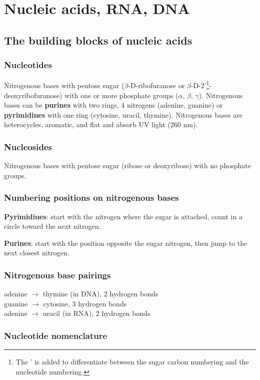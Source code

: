 \documentclass[letterpaper, 12pt]{article}
\begin{document}
\newpage

\section*{Nucleic acids, RNA, DNA}

\subsection*{The building blocks of nucleic acids}

\subsubsection*{Nucleotides}
Nitrogenous bases with pentose sugar ($\beta$-D-ribofuranose or $\beta$-D-2'\footnote{The ' is added to differentiate between the sugar carbon numbering and the nucleotide numbering.}-deoxyribofuranose) with one or more phosphate groups ($\alpha$, $\beta$, $\gamma$). Nitrogenous bases can be \textbf{purines} with two rings, 4 nitrogens (adenine, guanine) or \textbf{pyrimidines} with one ring (cytosine, uracil, thymine). Nitrogenous bases are heterocycles, aromatic, and flat and absorb UV light (260 nm).

\subsubsection*{Nucleosides}
Nitrogenous bases with pentose sugar (ribose or deoxyribose) with no phosphate groups.

\subsubsection*{Numbering positions on nitrogenous bases}
\textbf{Pyrimidines}: start with the nitrogen where the sugar is attached, count in a circle toward the next nitrogen.

\textbf{Purines}: start with the position opposite the sugar nitrogen, then jump to the next closest nitrogen.

\subsubsection*{Nitrogenous base pairings}
adenine $\to$ thymine (in DNA), 2 hydrogen bonds \\
guanine $\to$ cytosine, 3 hydrogen bonds \\
adenine $\to$ uracil (in RNA), 2 hydrogen bonds

\subsubsection*{Nucleotide nomenclature}
\end{document}
